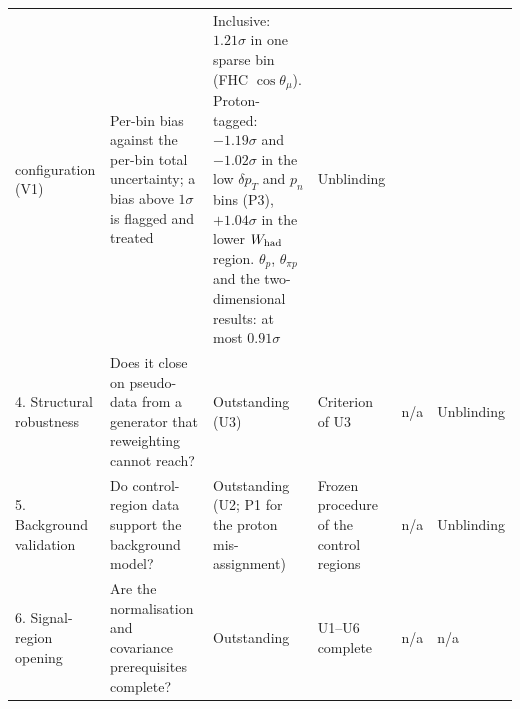 {\begin{longtable}{@{}p{1.9cm}p{2.7cm}p{2.6cm}p{2.7cm}p{2.9cm}p{1.6cm}@{}}
  configuration (V1) &
  Per-bin bias against the per-bin total uncertainty; a bias above $1\sigma$ is flagged and treated &
  Inclusive: $1.21\sigma$ in one sparse bin (FHC $\cos\theta_\mu$). Proton-tagged: $-1.19\sigma$ and
  $-1.02\sigma$ in the low $\delta p_T$ and $p_n$ bins (P3), $+1.04\sigma$ in the lower $W_{\rm had}$ region.
  $\theta_p$, $\theta_{\pi p}$ and the two-dimensional results: at most $0.91\sigma$ & Unblinding \\
4. Structural robustness & Does it close on pseudo-data from a generator that reweighting cannot reach? &
  Outstanding (U3) & Criterion of U3 & n/a & Unblinding \\
5. Background validation & Do control-region data support the background model? &
  Outstanding (U2; P1 for the proton mis-assignment) &
  Frozen procedure of the control regions & n/a & Unblinding \\
6. Signal-region opening & Are the normalisation and covariance prerequisites complete? &
  Outstanding & U1--U6 complete & n/a & n/a \\
\end{longtable}}
